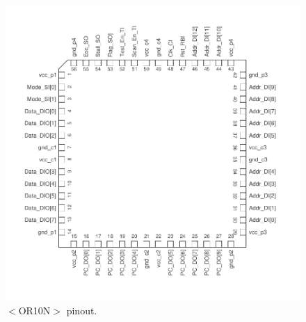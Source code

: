\begin{figure}[!htbp]
  \centering \includegraphics[width=1.0\textwidth]{./figures/asic_pinout}
  \caption{$<$OR10N$>$ pinout.}
\end{figure}

